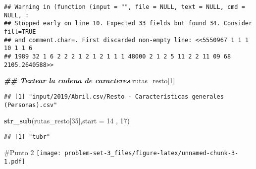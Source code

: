 \documentclass[
]{article}
\newenvironment{Shaded}{\begin{snugshade}}{\end{snugshade}}
\newcommand{\AttributeTok}[1]{\textcolor[rgb]{0.13,0.29,0.53}{#1}}
\newcommand{\ConstantTok}[1]{\textcolor[rgb]{0.56,0.35,0.01}{#1}}
\newcommand{\ControlFlowTok}[1]{\textcolor[rgb]{0.13,0.29,0.53}{\textbf{#1}}}
\newcommand{\DecValTok}[1]{\textcolor[rgb]{0.00,0.00,0.81}{#1}}
\newcommand{\DocumentationTok}[1]{\textcolor[rgb]{0.56,0.35,0.01}{\textbf{\textit{#1}}}}
\newcommand{\FunctionTok}[1]{\textcolor[rgb]{0.13,0.29,0.53}{\textbf{#1}}}
\newcommand{\NormalTok}[1]{#1}
\newcommand{\OtherTok}[1]{\textcolor[rgb]{0.56,0.35,0.01}{#1}}
\newcommand{\SpecialCharTok}[1]{\textcolor[rgb]{0.81,0.36,0.00}{\textbf{#1}}}
\begin{document}
\begin{verbatim}
## Warning in (function (input = "", file = NULL, text = NULL, cmd = NULL, :
## Stopped early on line 10. Expected 33 fields but found 34. Consider fill=TRUE
## and comment.char=. First discarded non-empty line: <<5550967 1 1 1 10 1 1 6
## 1989 32 1 6 2 2 2 1 2 1 2 1 1 1 48000 2 1 2 5 11 2 2 11 09 68 2105.2640588>>
\end{verbatim}

\begin{Shaded}
\begin{Highlighting}[]
\DocumentationTok{\#\# Textear la cadena de caracteres }
\NormalTok{rutas\_resto[}\DecValTok{1}\NormalTok{]}
\end{Highlighting}
\end{Shaded}

\begin{verbatim}
## [1] "input/2019/Abril.csv/Resto - Características generales (Personas).csv"
\end{verbatim}

\begin{Shaded}
\begin{Highlighting}[]
\FunctionTok{str\_sub}\NormalTok{(rutas\_resto[}\DecValTok{35}\NormalTok{],}\AttributeTok{start =} \DecValTok{14}\NormalTok{ , }\DecValTok{17}\NormalTok{)}
\end{Highlighting}
\end{Shaded}

\begin{verbatim}
## [1] "tubr"
\end{verbatim}

\begin{Shaded}
\end{Shaded}

\#Punto 2
\texttt{[image: problem-set-3\_files/figure-latex/unnamed-chunk-3-1.pdf]}
\end{document}
